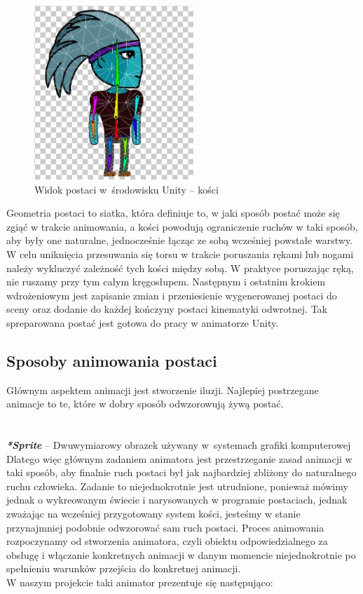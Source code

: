 \documentclass[oneside,polski,logo]{amuthesis}
\begin{document}
\begin{figure}[h]
	\centering
	\includegraphics[width=6cm]{images/kozubal/bones.jpg}
	\caption{Widok postaci w~środowisku Unity – kości}
\end{figure}

Geometria postaci to siatka, która definiuje to, w jaki sposób postać może się zgiąć w trakcie animowania, a kości powodują ograniczenie ruchów w taki sposób, aby były one naturalne, jednocześnie łącząc ze sobą wcześniej powstałe warstwy. W celu uniknięcia przesuwania się torsu w trakcie poruszania rękami lub nogami należy wykluczyć zależność tych kości między sobą. W praktyce poruszając ręką, nie ruszamy przy tym całym kręgosłupem.
Następnym i ostatnim krokiem wdrożeniowym jest zapisanie zmian i przeniesienie wygenerowanej postaci do sceny oraz dodanie do każdej kończyny postaci kinematyki odwrotnej. Tak spreparowana postać jest gotowa do pracy w animatorze Unity.



\subsection{Sposoby animowania postaci}
Głównym aspektem animacji jest stworzenie iluzji. Najlepiej postrzegane animacje to te, które w dobry sposób odwzorowują żywą postać.\\
\noindent\makebox[\linewidth]{\rule{15cm}{0.4pt}}\\
\\
\textbf{\textit{*Sprite}} – Dwuwymiarowy obrazek używany w~systemach grafiki komputerowej \newpage
Dlatego więc głównym zadaniem animatora jest przestrzeganie zasad animacji w taki sposób, aby finalnie ruch postaci był jak najbardziej zbliżony do naturalnego ruchu człowieka.
Zadanie to niejednokrotnie jest utrudnione, ponieważ mówimy jednak o wykreowanym świecie i narysowanych w programie postaciach, jednak zważając na wcześniej przygotowany system kości, jesteśmy w stanie przynajmniej podobnie odwzorować sam ruch postaci. 
Proces animowania rozpoczynamy od stworzenia animatora, czyli obiektu odpowiedzialnego za obsługę i włączanie konkretnych animacji w danym momencie niejednokrotnie po spełnieniu warunków przejścia do konkretnej animacji. \cite{animation1} \\
W naszym projekcie taki animator prezentuje się następująco:
\end{document}
